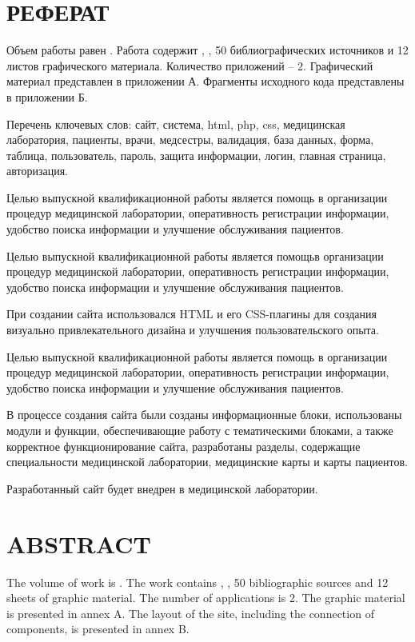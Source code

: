 \newsection
\section*{РЕФЕРАТ}

Объем работы равен . Работа содержит , , 50 библиографических источников и 12 листов графического материала. Количество приложений – 2. Графический материал представлен в приложении А. Фрагменты исходного кода представлены в приложении Б.

Перечень ключевых слов: сайт, система, html, php, css, медицинская лаборатория, пациенты, врачи, медсестры, валидация, база данных, форма, таблица, пользователь, пароль, защита информации, логин, главная страница, авторизация.

Целью выпускной квалификационной работы является помощь в организации процедур медицинской лаборатории, оперативность регистрации информации, удобство поиска информации и улучшение обслуживания пациентов.

Целью выпускной квалификационной работы является помощь\linebreak в организации процедур медицинской лаборатории, оперативность регистрации информации, удобство поиска информации и улучшение обслуживания пациентов.

При создании сайта использовался HTML и его CSS-плагины для создания визуально привлекательного дизайна и улучшения пользовательского опыта.

Целью выпускной квалификационной работы является помощь в организации процедур медицинской лаборатории, оперативность регистрации информации, удобство поиска информации и улучшение обслуживания пациентов.

В процессе создания сайта были созданы информационные блоки, использованы модули и функции, обеспечивающие работу с тематическими блоками, а также корректное функционирование сайта, разработаны разделы, содержащие специальности медицинской лаборатории, медицинские карты и карты пациентов.

Разработанный сайт будет внедрен в медицинской лаборатории.
\newpage
{}
\section*{ABSTRACT}
  
The volume of work is . The work contains , , 50 bibliographic sources and 12 sheets of graphic material. The number of applications is 2. The graphic material is presented in annex A. The layout of the site, including the connection of components, is presented in annex B.

